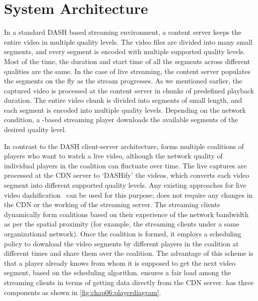 \section{System Architecture}
\label{sec:chap06:systemDesign}
In a standard \ac{DASH} based streaming environment, a content server keeps the entire video in multiple quality levels. The video files are divided into many small segments, and every segment is encoded with multiple supported quality levels. Most of the time, the duration and start time of all the segments across different qualities are the same. In the case of live streaming, the content server populates the segments on the fly as the stream progresses. As we mentioned earlier, the captured video is processed at the content server in chunks of predefined playback duration. The entire video chunk is divided into segments of small length, and each segment is encoded into multiple quality levels. Depending on the network condition, a -based streaming player downloads the available segments of the desired quality level.

In contrast to the \ac{DASH} client-server architecture, {\our} forms multiple coalitions of players who want to watch a live video, although the network quality of individual players in the coalition can fluctuate over time. %
The live captures are processed at the \ac{CDN} server to `DASHify' the videos, which converts each video segment into different supported quality levels. Any existing approaches for live video dashification~\cite{wei2014low,pires2014dash} can be used for this purpose; {\our} does not require any changes in the \ac{CDN} or the working of the streaming server. The streaming clients dynamically form coalitions based on their experience of the network bandwidth as per the spatial proximity (for example, the streaming clients under a same organizational network). Once the coalition is formed, it employs a scheduling policy to download the video segments by different players in the coalition at different times and share them over the coalition. The advantage of this scheme is that a player already knows from whom it is supposed to get the next video segment, based on the scheduling algorithm. {\our} ensures a fair load among the streaming clients in terms of getting data directly from the \ac{CDN} server.
{\our} has three components as shown in \fig\ref{fig:chap06:playerdiagram}.

